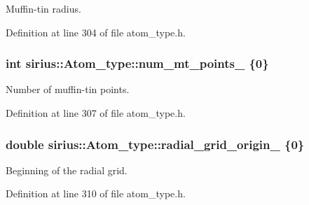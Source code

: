 Muffin-\/tin radius. 



Definition at line 304 of file atom\+\_\+type.\+h.

\hypertarget{classsirius_1_1_atom__type_a75389b693e7d82d6a64ccefa9060e9a8}{}
\subsubsection[{num\+\_\+mt\+\_\+points\+\_\+}]{\setlength{\rightskip}{0pt plus 5cm}int sirius\+::\+Atom\+\_\+type\+::num\+\_\+mt\+\_\+points\+\_\+ \{0\}\hspace{0.3cm}{\ttfamily [private]}}\label{classsirius_1_1_atom__type_a75389b693e7d82d6a64ccefa9060e9a8}


Number of muffin-\/tin points. 



Definition at line 307 of file atom\+\_\+type.\+h.

\hypertarget{classsirius_1_1_atom__type_aea51b36d134b6b1253f52baf4b85f613}{}
\subsubsection[{radial\+\_\+grid\+\_\+origin\+\_\+}]{\setlength{\rightskip}{0pt plus 5cm}double sirius\+::\+Atom\+\_\+type\+::radial\+\_\+grid\+\_\+origin\+\_\+ \{0\}\hspace{0.3cm}{\ttfamily [private]}}\label{classsirius_1_1_atom__type_aea51b36d134b6b1253f52baf4b85f613}


Beginning of the radial grid. 



Definition at line 310 of file atom\+\_\+type.\+h.

\hypertarget{classsirius_1_1_atom__type_a0cdf5c6087f404ca30ce1601a57c5db8}{}
